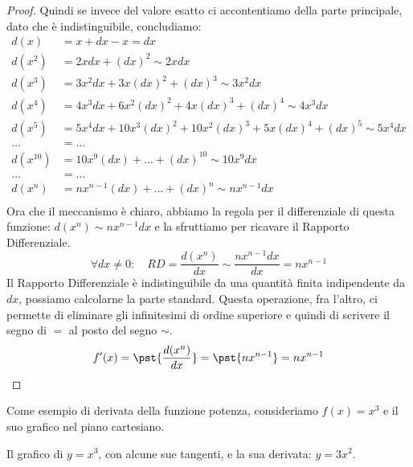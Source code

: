 \begin{proof}
Quindi se invece del valore esatto ci accontentiamo della parte principale, 
dato che è indistinguibile, concludiamo:
\nopagebreak
\begin{align*}
  d(x) &=x+dx-x =dx\\
  d(x^2) &=2xdx +(dx)^2 \sim 2xdx\\
  d(x^3) &=3x^2dx+3x(dx)^2+(dx)^3 \sim 3x^2dx\\
  d(x^4) &=4x^3dx+6x^2(dx)^2+4x(dx)^3+(dx)^4 \sim 4x^3dx\\
  d(x^5) &=5x^4dx+10x^3(dx)^2+10x^2(dx)^3+5x(dx)^4+(dx)^5 \sim 5x^4dx\\
  \dots &= \dots\\
  d(x^{10}) &=10x^9(dx)+\dots+(dx)^{10} \sim 10x^9dx\\
  \dots &= \dots\\
  d(x^n) &=nx^{n-1}(dx)+\dots+(dx)^{n} \sim nx^{n-1}dx\\    
\end{align*}
Ora che il meccanismo è chiaro, abbiamo la regola per il differenziale di 
questa 
funzione: \(d(x^n) \sim nx^{n-1}dx\) 
e la sfruttiamo per ricavare il Rapporto Differenziale.
\[ \forall dx\ne 0:\quad
 RD =\dfrac{d(x^n)}{dx}\sim \dfrac{nx^{n-1}dx}{dx}=nx^{n-1}\]
Il Rapporto Differenziale è indistinguibile da una quantità finita 
indipendente da \(dx\), possiamo calcolarne la parte standard. 
Questa operazione, fra l'altro, ci permette di eliminare gli infinitesimi 
di ordine superiore e quindi di scrivere il segno di \(=\) al posto del 
segno \(\sim\).
\[ f'(x)=\pst{\dfrac{d(x^n)}{dx}}=\pst{nx^{n-1}}=nx^{n-1}\]
\end{proof}

Come esempio di derivata della funzione potenza, consideriamo \(f(x)=x^3\)
e il suo grafico nel piano cartesiano. 

\begin{inaccessibleblock}
\hspace{-20mm}
\end{inaccessibleblock}
\label{img:diff_cubica_con_pendenze}
\begin{center} Il grafico di \(y=x^3\), con alcune sue tangenti, e 
la sua derivata: \(y=3x^2\).\end{center}

